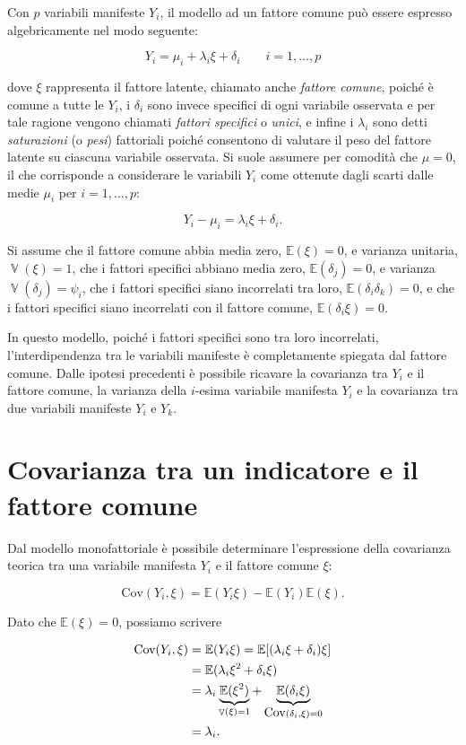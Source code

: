 \documentclass[
  11pt,
]{krantz}
\DeclareMathOperator{\V}{\mathbb{V}} %
\newcommand{\E}{\mathbb{E}} %
\theoremstyle{definition}
\theoremstyle{definition}
\theoremstyle{definition}
\theoremstyle{definition}
\theoremstyle{remark}
\begin{document}
Con \(p\) variabili manifeste \(Y_i\), il modello ad un fattore comune può essere espresso algebricamente nel modo seguente:

\[
Y_i = \mu_i + \lambda_{i} \xi + \delta_i \qquad i=1, \dots, p
\]

dove \(\xi\) rappresenta il fattore latente, chiamato anche \emph{fattore comune}, poiché è comune a tutte le \(Y_i\), i \(\delta_i\) sono invece specifici di ogni variabile osservata e per tale ragione vengono chiamati \emph{fattori specifici} o \emph{unici}, e infine i \(\lambda_i\) sono detti \emph{saturazioni} (o \emph{pesi}) fattoriali poiché consentono di valutare il peso del fattore latente su ciascuna variabile osservata. Si suole assumere per comodità che \(\mu=0\), il che corrisponde a considerare le variabili \(Y_i\) come ottenute dagli scarti dalle medie \(\mu_i\) per \(i = 1, \dots, p\):

\[Y_i -\mu_i = \lambda_i \xi + \delta_i.\]

Si assume che il fattore comune abbia media zero, \(\E(\xi)=0\), e varianza unitaria, \(\V(\xi)=1\), che i fattori specifici abbiano media zero, \(\E(\delta_j)=0\), e varianza \(\V(\delta_j)=\psi_{i}\), che i fattori specifici siano incorrelati tra loro, \(\E(\delta_i \delta_k)=0\), e che i fattori specifici siano incorrelati con il fattore comune, \(\E(\delta_i \xi)=0\).

In questo modello, poiché i fattori specifici sono tra loro incorrelati, l'interdipendenza tra le variabili manifeste è completamente spiegata dal fattore comune. Dalle ipotesi precedenti è possibile ricavare la covarianza tra \(Y_i\) e il fattore comune, la varianza della \(i\)-esima variabile manifesta \(Y_i\) e la covarianza tra due variabili manifeste \(Y_i\) e \(Y_k\).

\hypertarget{covarianza-tra-un-indicatore-e-il-fattore-comune}{%
\section{Covarianza tra un indicatore e il fattore comune}\label{covarianza-tra-un-indicatore-e-il-fattore-comune}}

Dal modello monofattoriale è possibile determinare l'espressione della covarianza teorica tra una variabile manifesta \(Y_i\) e il fattore comune \(\xi\):

\[
\mbox{Cov}(Y_i,\xi)=\E(Y_i \xi)-\E(Y_i)\E(\xi).
\]

Dato che \(\E(\xi)=0\), possiamo scrivere

\begin{equation}
\begin{aligned}
  \mbox{Cov}(Y_i,\xi) &= \E(Y_i \xi)=\E[(\lambda_i \xi + \delta_i) \xi]\notag\\
  &=\E(\lambda_i \xi^2 + \delta_i \xi)\notag\\
  &=\lambda_i\underbrace{\E(\xi^2)}_{\V(\xi)=1} + \underbrace{\E(\delta_i \xi)}_{\mbox{Cov}(\delta_i, \xi)=0}\notag\\
  &= \lambda_i.\notag
\end{aligned}
\end{equation}
\end{document}
